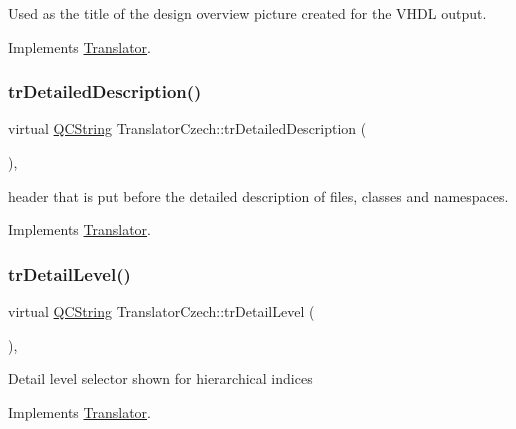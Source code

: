 Used as the title of the design overview picture created for the V\+H\+DL output. 

Implements \mbox{\hyperlink{class_translator}{Translator}}.

\mbox{\label{class_translator_czech_aaf320a13caf51f252e5bdf330eadfa22}} 
\subsubsection{\texorpdfstring{trDetailedDescription()}{trDetailedDescription()}}
{\footnotesize\ttfamily virtual \mbox{\hyperlink{class_q_c_string}{Q\+C\+String}} Translator\+Czech\+::tr\+Detailed\+Description (\begin{DoxyParamCaption}{ }\end{DoxyParamCaption})\hspace{0.3cm}{\ttfamily [inline]}, {\ttfamily [virtual]}}

header that is put before the detailed description of files, classes and namespaces. 

Implements \mbox{\hyperlink{class_translator}{Translator}}.

\mbox{\label{class_translator_czech_a15941f83613d8d969fcc3164331b21f6}} 
\subsubsection{\texorpdfstring{trDetailLevel()}{trDetailLevel()}}
{\footnotesize\ttfamily virtual \mbox{\hyperlink{class_q_c_string}{Q\+C\+String}} Translator\+Czech\+::tr\+Detail\+Level (\begin{DoxyParamCaption}{ }\end{DoxyParamCaption})\hspace{0.3cm}{\ttfamily [inline]}, {\ttfamily [virtual]}}

Detail level selector shown for hierarchical indices 

Implements \mbox{\hyperlink{class_translator}{Translator}}.

\mbox{\label{class_translator_czech_ae31ae6026b12ff3423988ec06d2ba997}} 
